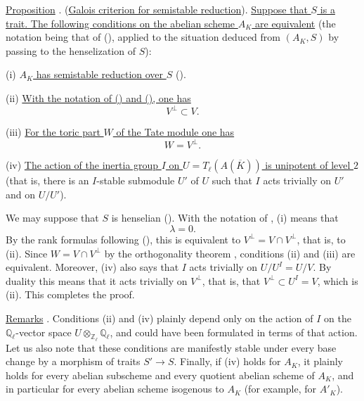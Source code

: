 
\medskip
\noindent
\underline{Proposition} . (\underline{Galois criterion for semistable
reduction}).  \underline{Suppose that $S$ is a trait.  The following conditions on the
abelian scheme $A_K$ are equivalent} (the notation being that of (),
applied to the situation deduced from $(A_K,S)$ by passing to the
henselization of $S$):

\smallskip
\noindent
(i) \underline{$A_K$ has semistable reduction over $S$} ().

\smallskip
\noindent
(ii) \underline{With the notation of () and (), one has}
\[
 V^\perp\subset V.
\]

\noindent
(iii) \underline{For the toric part $W$ of the Tate module one has}
\[
 W=V^\perp.
\]

\noindent
(iv) \underline{The action of the inertia group $I$ on
$U=T_\ell(A(\overline K))$ is unipotent of level $2$} (that is, there is an
$I$-stable submodule $U'$ of $U$ such that $I$ acts trivially on $U'$ and
on $U/U'$).

We may suppose that $S$ is henselian ().  With the notation of ,
(i) means that
\[
 \lambda=0.
\]
By the rank formulas following (), this is equivalent to
$V^\perp=V\cap V^\perp$, that is, to (ii).  Since
$W=V\cap V^\perp$ by the orthogonality theorem , conditions (ii) and
(iii) are equivalent.  Moreover, (iv) also says that $I$ acts trivially
on $U/U^I=U/V$.  By duality this means that it acts trivially on
$V^\perp$, that is, that $V^\perp\subset U^I=V$, which is (ii).  This
completes the proof.

\medskip
\noindent
\underline{Remarks} .  Conditions (ii) and (iv) plainly depend only
on the action of $I$ on the $\mathbb Q_\ell$-vector space
$U\otimes_{\mathbb Z_\ell}\mathbb Q_\ell$, and could have been formulated
in terms of that action.  Let us also note that these conditions are
manifestly stable under every base change by a morphism of traits
$S'\longrightarrow S$.  Finally, if (iv) holds for $A_K$, it plainly holds
for every abelian subscheme and every quotient abelian scheme of $A_K$,
and in particular for every abelian scheme isogenous to $A_K$ (for
example, for $A'_K$).

